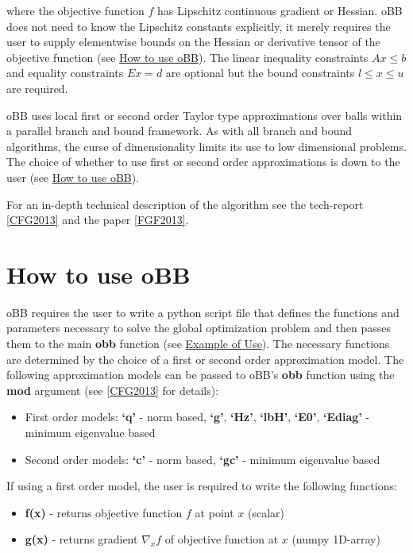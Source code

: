 \documentclass[letterpaper,11pt,openany,oneside]{sphinxmanual}
\begin{document}
where the objective function $f$ has Lipschitz continuous gradient or Hessian. oBB does not need to know the Lipschitz constants explicitly, it merely requires the user to supply elementwise bounds on the Hessian or derivative tensor of the objective function (see {\hyperref[userguide:how-to-use-obb]{How to use oBB}}). The linear inequality constraints $Ax \le b$ and equality constraints $Ex = d$ are optional but the bound constraints $l \le x \le u$ are required.

oBB uses local first or second order Taylor type approximations over balls within a parallel branch and bound framework. As with all branch and bound algorithms, the curse of dimensionality limits its use to low dimensional problems. The choice of whether to use first or second order approximations is down to the user  (see {\hyperref[userguide:how-to-use-obb]{How to use oBB}}).

For an in-depth technical description of the algorithm see the tech-report {\hyperref[userguide:cfg2013]{{[}CFG2013{]}}} and the paper {\hyperref[userguide:fgf2013]{{[}FGF2013{]}}}.


\section{How to use oBB}
\label{userguide:how-to-use-obb}
oBB requires the user to write a python script file that defines the functions and parameters necessary to solve the global optimization problem and then passes them to the main \textbf{obb} function (see {\hyperref[userguide:example-of-use]{Example of Use}}). The necessary functions are determined by the choice of a first or second order approximation model. The following approximation models can be passed to oBB's \textbf{obb} function using the \textbf{mod} argument (see {\hyperref[userguide:cfg2013]{{[}CFG2013{]}}} for details):
\begin{itemize}
\item {} 
First order models: \textbf{`q'} - norm based,  \textbf{`g'}, \textbf{`Hz'}, \textbf{`lbH'}, \textbf{`E0'}, \textbf{`Ediag'} - minimum eigenvalue based

\item {} 
Second order models: \textbf{`c'} - norm based, \textbf{`gc'} - minimum eigenvalue based

\end{itemize}

If using a first order model, the user is required to write the following functions:
\begin{itemize}
\item {} 
\textbf{f(x)} - returns objective function $f$ at point $x$ (scalar)

\item {} 
\textbf{g(x)} - returns gradient $\nabla_x f$ of objective function at $x$ (numpy 1D-array)

\end{itemize}
\end{document}

